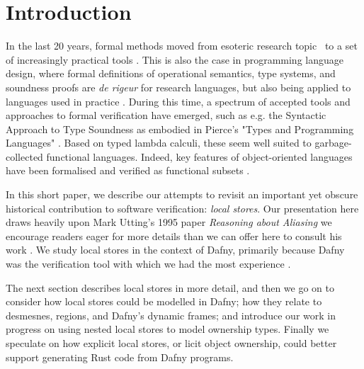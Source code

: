\section{Introduction}

In the last 20 years, formal methods moved from esoteric research
topic~\cite{CoqTute11} to a set of increasingly practical tools
\cite{alloybook,tlabook,spinbook,dafny2023}.  This is also the case in
programming language design, where formal definitions of operational
semantics, type systems, and soundness proofs are \textit{de rigeur}
for research languages, but also being applied to languages used in
practice \cite{RustBelt18,djpRust}.  During this time, a spectrum of
accepted tools and approaches to formal verification have emerged,
such as e.g. the Syntactic Approach to Type Soundness
\cite{wright_syntactic_1994} as embodied in Pierce's "Types and
Programming Languages" \cite{pierce_types_2002}.  Based on typed
lambda calculi, these seem well suited to garbage-collected functional
languages. Indeed, key features of object-oriented languages have been
formalised and verified as functional subsets
\cite{IgaPieWadTOPLAS01}.





In this short paper, we describe our attempts to revisit an important
yet obscure historical contribution to software verification:
\textit{local stores}. Our presentation here draws heavily upon Mark
Utting's 1995 paper \textit{Reasoning about Aliasing} we encourage
readers eager for more details than we can offer here to consult his
work \cite{utting1995,utting1998}.  We study local stores in the
context of Dafny, primarily because Dafny was the verification tool
with which we had the most experience
\cite{MPTP,learn2024,flags2024,dafnydala-ftfjp2024}.

The next section describes local stores in more detail, and then we go
on to consider how local stores could be modelled in Dafny; how they
relate to desmesnes, regions, and Dafny's dynamic frames; and
introduce our work in progress on using nested local stores to model
ownership types.  Finally we speculate on how explicit local stores,
or licit object ownership, could better support generating Rust code
from Dafny programs.

